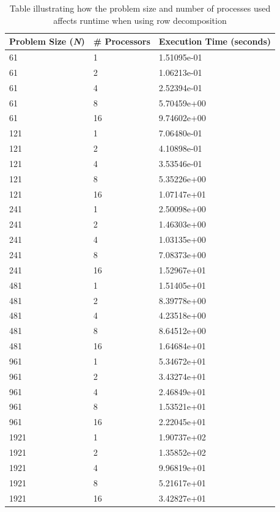 \documentclass{article}
\begin{document}
\begin{table}
	\centering
	\begin{tabular}{|l|l|l|}
	\hline
	\textbf{Problem Size (\textit{N})} & \textbf{\# Processors}  & \textbf{Execution Time (seconds)} \\ 
	\hline
	61 & 1 & 1.51095e-01 \\
	61 & 2 & 1.06213e-01 \\	
	61 & 4 & 2.52394e-01 \\	
	61 & 8 & 5.70459e+00 \\	
	61 & 16 & 9.74602e+00 \\	
	\hline
	121 & 1 & 7.06480e-01 \\
	121 & 2 & 4.10898e-01 \\
	121 & 4 & 3.53546e-01 \\
	121 & 8 & 5.35226e+00 \\
	121 & 16 & 1.07147e+01 \\
	\hline	
	241 & 1 & 2.50098e+00 \\
	241 & 2 & 1.46303e+00 \\
	241 & 4 & 1.03135e+00 \\
	241 & 8 & 7.08373e+00 \\
	241 & 16 & 1.52967e+01 \\ 
	\hline	
	481 & 1 & 1.51405e+01 \\
	481 & 2 & 8.39778e+00 \\ 
	481 & 4 & 4.23518e+00 \\
	481 & 8 & 8.64512e+00 \\
	481 & 16 & 1.64684e+01 \\
	\hline	
	961 & 1 & 5.34672e+01 \\ 
	961 & 2 & 3.43274e+01 \\
	961 & 4 & 2.46849e+01 \\
	961 & 8 & 1.53521e+01 \\ 
	961 & 16 & 2.22045e+01 \\
	\hline	
	1921 & 1 & 1.90737e+02 \\
	1921 & 2 & 1.35852e+02 \\
	1921 & 4 & 9.96819e+01 \\
	1921 & 8 & 5.21617e+01 \\
	1921 & 16 & 3.42827e+01 \\
	\hline
	\end{tabular}
	\caption{Table illustrating how the problem size and number of processes used affects runtime when using row decomposition}
	\label{tab:row_decomp_scalability}
\end{table}
\end{document}
